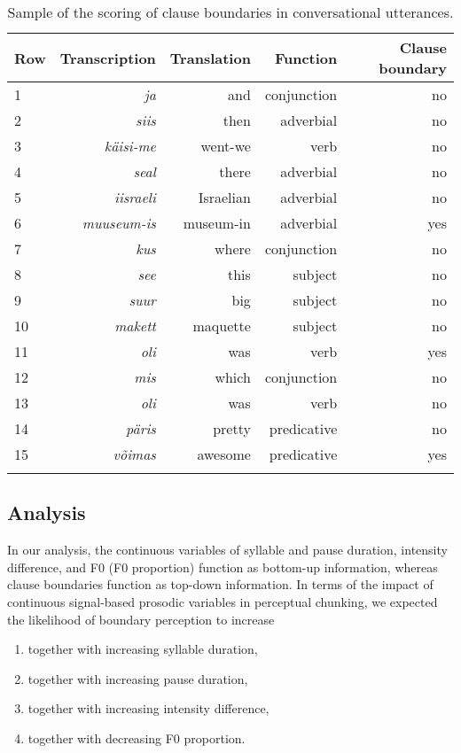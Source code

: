 \documentclass[output=paper]{langscibook}
\begin{document}
    \begin{table}%
	    \caption{Sample of the scoring of clause boundaries in conversational utterances.}
	    \label{tab:1:clauses}
	    \begin{tabular}{l rrrr}
		    \lsptoprule
		    Row & Transcription & Translation &  Function & Clause boundary \\
		    \midrule
		    1 & \textit{ja} & and&	conjunction	&  no\\
		    2 & \textit{siis}& then &	adverbial &	no\\
		    3 & \textit{käisi-me}& went-we &	verb & no\\
		    4 & \textit{seal}& there& adverbial & no\\
		    5 & \textit{iisraeli}& Israelian&	adverbial & no\\
		    6 & \textit{muuseum-is}& museum-in&	adverbial &	yes \\
		    7 & \textit{kus}& where&	conjunction & no\\
		    8 & \textit{see}& this&	subject & no\\
		    9 & \textit{suur}& big&	subject & no\\
		    10 & \textit{makett}& maquette&	subject & no\\
		    11 & \textit{oli}& was&	verb &	yes\\
		    12 & \textit{mis}& which&	conjunction & no\\
		    13 & \textit{oli}& was &	verb & no\\
	    	14 & \textit{päris}& pretty & predicative &	no\\
		    15 & \textit{võimas}&	awesome & predicative &	yes\\
		\lspbottomrule
	\end{tabular}
    \end{table}

    \subsection{Analysis} 
    In our analysis, the continuous variables of syllable and pause duration, intensity difference, and F0 (F0 proportion) function as bottom-up information, whereas clause boundaries function as top-down information. In terms of the impact of continuous signal-based prosodic variables in perceptual chunking, we expected the likelihood of boundary perception to increase
    
    \begin{enumerate}
	    \item together with increasing syllable duration,
	    \item together with increasing pause duration,
	    \item together with increasing intensity difference,
	    \item together with decreasing F0 proportion.
    \end{enumerate}
\end{document}
